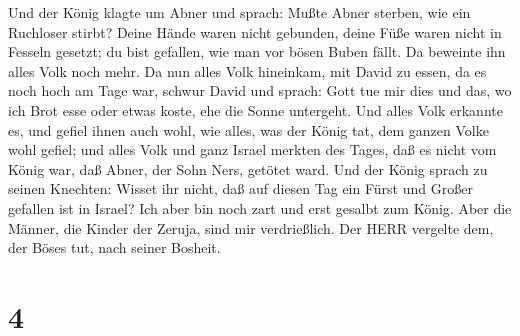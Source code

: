  Und der König klagte um Abner und sprach: Mußte Abner
sterben, wie ein Ruchloser stirbt?  Deine Hände waren nicht
gebunden, deine Füße waren nicht in Fesseln gesetzt; du bist gefallen,
wie man vor bösen Buben fällt. Da beweinte ihn alles Volk noch mehr.
 Da nun alles Volk hineinkam, mit David zu essen, da es
noch hoch am Tage war, schwur David und sprach: Gott tue mir dies und
das, wo ich Brot esse oder etwas koste, ehe die Sonne untergeht.
 Und alles Volk erkannte es, und gefiel ihnen auch wohl,
wie alles, was der König tat, dem ganzen Volke wohl gefiel;
 und alles Volk und ganz Israel merkten des Tages, daß es
nicht vom König war, daß Abner, der Sohn Ners, getötet ward.
 Und der König sprach zu seinen Knechten: Wisset ihr nicht,
daß auf diesen Tag ein Fürst und Großer gefallen ist in Israel?
 Ich aber bin noch zart und erst gesalbt zum König. Aber
die Männer, die Kinder der Zeruja, sind mir verdrießlich. Der HERR
vergelte dem, der Böses tut, nach seiner Bosheit.

\hypertarget{section-3}{%
\section{4}\label{section-3}}

